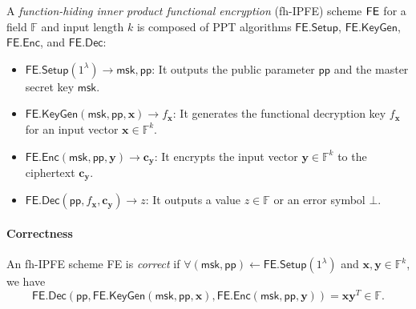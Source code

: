 


\begin{definition}
\label{def:fh-IPFE}
	A \emph{function-hiding inner product functional encryption} (fh-IPFE) scheme $\sf FE$ for a field $\mathbb{F}$ and input length $k$ is composed of PPT algorithms $\textsf{FE.Setup}$, $\textsf{FE.KeyGen}$, $\textsf{FE.Enc}$, and $\textsf{FE.Dec}$:

	\begin{itemize}
	
		\item $\textsf{FE.Setup}(1^\lambda) \to \textsf{msk}, \textsf{pp}$: It outputs the public parameter $\textsf{pp}$ and the master secret key $\textsf{msk}$.
	
		\item $\textsf{FE.KeyGen}(\textsf{msk}, \textsf{pp}, \mathbf{x}) \to f_\mathbf{x}$: It generates the functional decryption key $f_\mathbf{x}$ for an input vector $\mathbf{x} \in \mathbb{F}^k$. 
	
		\item $\textsf{FE.Enc}(\textsf{msk}, \textsf{pp}, \mathbf{y}) \to \mathbf{c_y}$: It encrypts the input vector $\mathbf{y} \in \mathbb{F}^k$ to the ciphertext $\mathbf{c_y}$. 
	
		\item $\textsf{FE.Dec}(\textsf{pp}, f_\mathbf{x}, \mathbf{c_y}) \to z$: It outputs a value $z \in \mathbb{F}$ or an error symbol $\bot$.
	
	\end{itemize}
	
	\paragraph{\textbf{Correctness}} An fh-IPFE scheme \textsf{FE} is \emph{correct} if $\forall (\textsf{msk}, \textsf{pp}) \gets \textsf{FE.Setup}(1^\lambda)$ and $ \mathbf{x}, \mathbf{y} \in \mathbb{F}^k$, we have
	\[
		\textsf{FE.Dec}( \textsf{pp}, \textsf{FE.KeyGen}(\textsf{msk}, \textsf{pp}, \mathbf{x}), \textsf{FE.Enc}(\textsf{msk}, \textsf{pp}, \mathbf{y}) ) = \mathbf{x} \mathbf{y}^T \in \mathbb{F}.
	\]

\end{definition}

